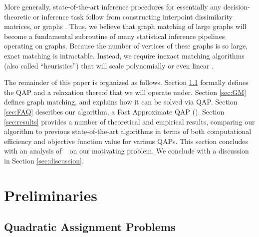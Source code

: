 \documentclass[preprint,11pt]{elsarticle}
\begin{document}
More generally, state-of-the-art inference procedures for essentially any decision-theoretic or inference task follow from constructing interpoint dissimilarity matrices, or graphs \cite{Duin2011}.  Thus, we believe that graph matching of large graphs will become a fundamental subroutine of many statistical inference pipelines operating on graphs. Because the number of vertices of these graphs is so large, exact matching is intractable.   Instead, we require inexact matching algorithms (also called ``heuristics'') that will scale polynomially or even linear \cite{Conte2004}.  

The remainder of this paper is organized as follows.  
Section \ref{sec:QAP} formally defines the QAP and a relaxation thereof that we will operate under.  Section \ref{sec:GM} defines graph matching, and explains how it can be solved via QAP.  
Section \ref{sec:FAQ} describes our algorithm, a Fast Approximate QAP (\FAQ).  Section \ref{sec:results} provides a number of theoretical and empirical results, comparing our algorithm to previous state-of-the-art algorithms in terms of both computational efficiency and objective function value for various QAPs.  This section concludes with an analysis of \FAQ~ on our motivating problem. We conclude with a discussion in Section \ref{sec:discussion}.


\section{Preliminaries}

\subsection{Quadratic Assignment Problems} %
\label{sec:QAP}
\end{document}
